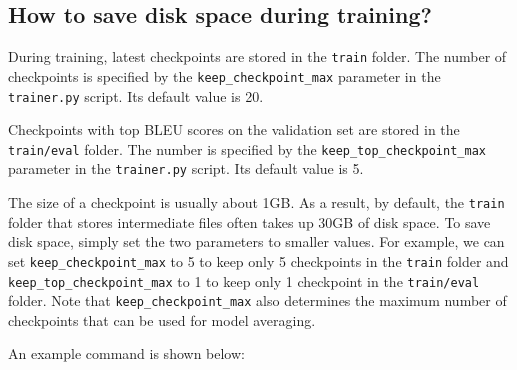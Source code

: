\documentclass{article}
\begin{document}
\subsection{How to save disk space during training?}

During training, latest checkpoints are stored in the \verb|train| folder. The number of checkpoints is specified by the \verb|keep_checkpoint_max| parameter in the \verb|trainer.py| script. Its default value is 20.

Checkpoints with top BLEU scores on the validation set are stored in the \verb|train/eval| folder. The number is specified by the \verb|keep_top_checkpoint_max| parameter in the \verb|trainer.py| script. Its default value is 5.

The size of a checkpoint is usually about 1GB. As a result, by default, the \verb|train| folder that stores intermediate files often takes up 30GB of disk space. To save disk space, simply set the two parameters to smaller values. For example, we can set \verb|keep_checkpoint_max| to 5 to keep only 5 checkpoints in the \verb|train| folder and \verb|keep_top_checkpoint_max| to 1 to keep only 1 checkpoint in the \verb|train/eval| folder. Note that \verb|keep_checkpoint_max| also determines the maximum number of checkpoints that can be used for model averaging.

An example command is shown below:
\\
\end{document}
